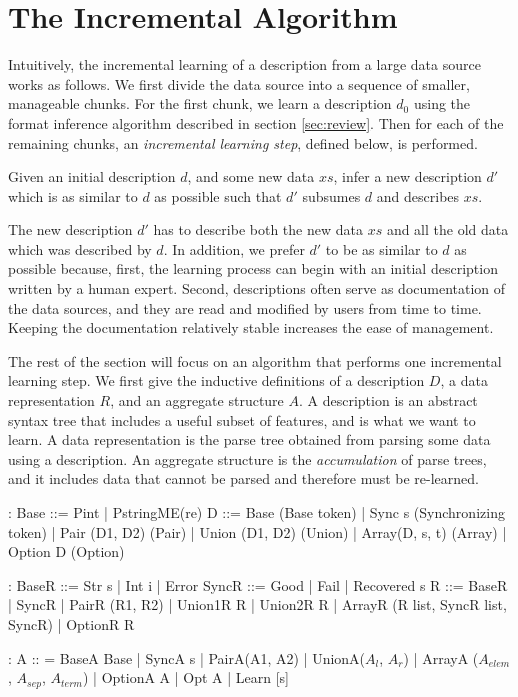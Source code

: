 \section{The Incremental Algorithm}
\label{sec:algo}
Intuitively, the incremental learning of a description from a large data source works
as follows. We first divide the data source into a sequence of smaller, manageable chunks.
For the first chunk, we learn a description $d_0$ using the format inference
algorithm described in section \ref{sec:review}. Then for each of the remaining chunks,
an {\em incremental learning step}, defined below, is performed.  

\begin{definition}
Given an initial description $d$, and some new data $xs$, infer a new description $d'$ 
which is as similar to $d$ as possible such that $d'$ subsumes $d$ and describes $xs$.
\end{definition}

The new description $d'$ has to describe both the new data $xs$ and
all the old data which was described by $d$. 
In addition, we prefer $d'$ to be as similar to $d$ as possible because, first,
the learning process can begin with an initial description 
written by a human expert. 
Second, descriptions often serve as documentation of the data sources, and they are
read and modified by users from time to time. Keeping the documentation relatively stable increases
the ease of management. 

The rest of the section will focus on an algorithm that
performs one incremental learning step.
We first give the inductive definitions of
a description $D$, a data representation $R$, and an aggregate structure $A$. 
A description is an abstract syntax tree that includes a useful subset
of \pads{} features, and is what we want to learn. A data representation is 
the parse tree obtained from parsing some data using a description. 
An aggregate structure is the {\em accumulation} of parse trees, and it
includes data that cannot be parsed and therefore must be re-learned.

\begin{code}
:
Base ::= Pint | PstringME(re)
D ::=   
  Base             (Base token)
| Sync s           (Synchronizing token) 
| Pair (D1, D2)    (Pair)
| Union (D1, D2)   (Union)
| Array(D, s, t)   (Array)
| Option D         (Option)

:
BaseR ::= Str s | Int i | Error
SyncR ::= Good | Fail | Recovered s 
R ::=
  BaseR
| SyncR
| PairR (R1, R2)
| Union1R R | Union2R R 
| ArrayR (R list, SyncR list, SyncR)
| OptionR R

\cdmath
{}:
A :: = 
  BaseA Base
| SyncA s
| PairA(A1, A2)
| UnionA($A_l$, $A_r$)
| ArrayA ($A_{elem}$, $A_{sep}$, $A_{term}$)
| OptionA A
| Opt A
| Learn [s]
\end{code}

